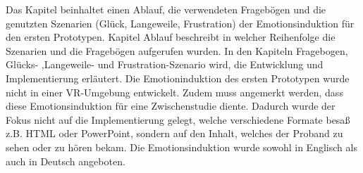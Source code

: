 

Das Kapitel beinhaltet einen Ablauf, die verwendeten Frageb{\"o}gen und die genutzten Szenarien (Gl{\"u}ck, Langeweile, Frustration) der Emotionsinduktion f{\"u}r den ersten Prototypen. 
Kapitel Ablauf beschreibt in welcher Reihenfolge die Szenarien und die Frageb{\"o}gen aufgerufen wurden. 
In den Kapiteln Fragebogen, Gl{\"u}cks- ,Langeweile- und Frustration-Szenario wird, die Entwicklung und Implementierung erl{\"a}utert. 
Die Emotioninduktion des ersten Prototypen wurde nicht in einer VR-Umgebung entwickelt. 
Zudem muss angemerkt werden, dass diese Emotionsinduktion f{\"u}r eine Zwischenstudie diente. 
Dadurch wurde der Fokus nicht auf die Implementierung gelegt, welche verschiedene Formate besa{\ss} z.B. HTML oder PowerPoint, sondern auf den Inhalt, welches der Proband zu sehen oder zu h{\"o}ren bekam.
Die Emotionsinduktion wurde sowohl in Englisch als auch in Deutsch angeboten.







